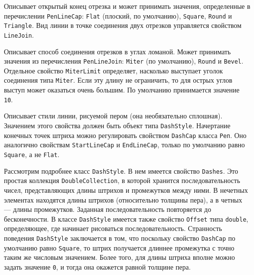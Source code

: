 \begin{description}[style=nextline]

\item [\texttt{StartLineCap} и \texttt{EndLineCap}] Описывает открытый конец отрезка и может принимать значения, определенные в перечислении \texttt{PenLineCap}: \texttt{Flat} (плоский, по умолчанию), \texttt{Square}, \texttt{Round} и \texttt{Triangle}. Вид линии в точке соединения двух отрезков управляется свойством \texttt{LineJoin}.

\item [\texttt{LineJoin}] Описывает способ соединения отрезков в углах ломаной. Может принимать значения из перечисления \texttt{PenLineJoin}: \texttt{Miter} (по умолчанию), \texttt{Round} и \texttt{Bevel}. Отдельное свойство \texttt{MiterLimit} определяет, насколько выступает уголок соединения типа \texttt{Miter}. Если эту длину не ограничить, то для острых углов выступ может оказаться очень большим. По умолчанию принимается значение \texttt{10}.

\item [\texttt{DashStyle}] Описывает стили линии, рисуемой пером (она необязательно сплошная). Значением этого свойства должен быть объект типа \texttt{DashStyle}. Начертание конечных точек штриха можно регулировать свойством \texttt{DashCap} класса \texttt{Реп}. Оно аналогично свойствам \texttt{StartLineCap} и \texttt{EndLineCap}, только по умолчанию равно \texttt{Square}, а не \texttt{Flat}.

\end{description}


Рассмотрим подробнее класс \texttt{DashStyle}. В нем имеется свойство \texttt{Dashes}. Это простая коллекция \texttt{DoubleCollection}, в которой хранится последовательность чисел, представляющих длины штрихов и промежутков между ними. В нечетных элементах находятся длины штрихов (относительно толщины пера), а в четных — длины промежутков. Заданная последовательность повторяется до бесконечности. В классе \texttt{DashStyle} имеется также свойство \texttt{Offset} типа \texttt{double}, определяющее, где начинает рисоваться последовательность. Странность поведения \texttt{DashStyle} заключается в том, что поскольку свойство \texttt{DashCap} по умолчанию равно \texttt{Square}, то штрих получается длиннее промежутка с точно таким же числовым значением. Более того, для длины штриха вполне можно задать значение \texttt{0}, и тогда она окажется равной толщине пера. 

